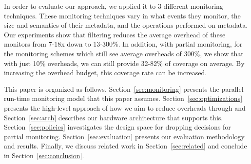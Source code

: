 
In order to evaluate our approach, we applied it to 3 different monitoring
techniques. These monitoring techniques vary in what events they monitor, the
size and semantics of their metadata, and the operations performed on metadata.
Our experiments show that filtering reduces the average overhead of these
monitors from 7-18x down to 13-300\%.
In addition, with partial monitoring, for the monitoring schemes which still
see average overheads of 300\%, we show that with just 10\% overheads, we can still
provide 32-82\% of coverage on average. By increasing the
overhead budget, this coverage rate can be increased. 

This paper is organized as follows. Section~\ref{sec:monitoring} presents the
parallel run-time monitoring model that this paper assumes.
Section~\ref{sec:optimizations} presents the high-level approach of how we aim
to reduce overheads through and Section~\ref{sec:arch} describes our
hardware architecture that supports this. Section~\ref{sec:policies}
investigates the design space for dropping decisions for partial monitoring.
Section~\ref{sec:evaluation} presents our evaluation methodology and
results. Finally, we discuss related work in Section~\ref{sec:related} and
conclude in Section~\ref{sec:conclusion}.

